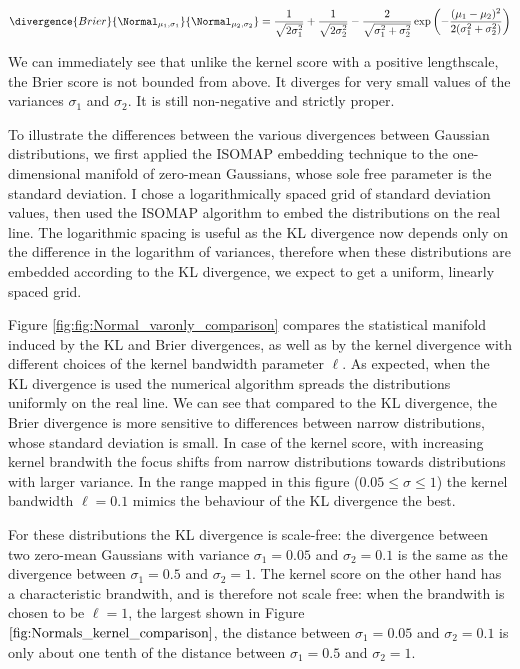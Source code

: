 \begin{equation}
	\divergence{Brier}{\Normal_{\mu_1,\sigma_1}}{\Normal_{\mu_2,\sigma_2}} = \frac{1}{\sqrt{2\sigma_1^2}} + \frac{1}{\sqrt{2\sigma_2^2}} - \frac{2}{\sqrt{\sigma_1^2 + \sigma_2^2}}\exp\left(-\frac{(\mu_1 - \mu_2)^2}{2(\sigma_1^2 + \sigma_2^2)}\right)
\end{equation}

We can immediately see that unlike the kernel score with a positive lengthscale, the Brier score is not bounded from above. It diverges for very small values of the variances $\sigma_1$ and $\sigma_2$. It is still non-negative and strictly proper.

To illustrate the differences between the various divergences between Gaussian distributions, we first applied the ISOMAP embedding technique to the one-dimensional manifold of zero-mean Gaussians, whose sole free parameter is the standard deviation. I chose a logarithmically spaced grid of standard deviation values, then used the ISOMAP algorithm to embed the distributions on the real line. The logarithmic spacing is useful as the KL divergence now depends only on the difference in the logarithm of variances, therefore when these distributions are embedded according to the KL divergence, we expect to get a uniform, linearly spaced grid.

Figure \ref{fig:fig:Normal_varonly_comparison} compares the statistical manifold induced by the KL and Brier divergences, as well as by the kernel divergence with different choices of the kernel bandwidth parameter $\ell$. As expected, when the KL divergence is used the numerical algorithm spreads the distributions uniformly on the real line. We can see that compared to the KL divergence, the Brier divergence is more sensitive to differences between narrow distributions, whose standard deviation is small. In case of the kernel score, with increasing kernel brandwith the focus shifts from narrow distributions towards distributions with larger variance. In the range mapped in this figure ($0.05 \leq \sigma \leq 1$) the kernel bandwidth $\ell=0.1$ mimics the behaviour of the KL divergence the best.

For these distributions the KL divergence is scale-free: the divergence between two zero-mean Gaussians with variance $\sigma_1=0.05$ and $\sigma_2 = 0.1$ is the same as the divergence between $\sigma_1=0.5$ and $\sigma_2 = 1$. The kernel score on the other hand has a characteristic brandwith, and is therefore not scale free: when the brandwith is chosen to be $\ell=1$, the largest shown in Figure $\ref{fig:Normals_kernel_comparison}$, the distance between $\sigma_1=0.05$ and $\sigma_2 = 0.1$ is only about one tenth of the distance between $\sigma_1=0.5$ and $\sigma_2 = 1$.

